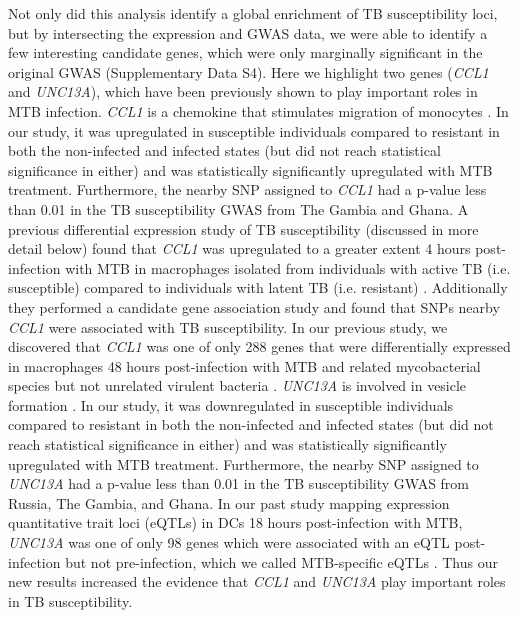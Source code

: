 \documentclass[fleqn,10pt]{wlscirep}
\begin{document}
Not only did this analysis identify a global enrichment of TB
susceptibility loci, but by intersecting the expression and GWAS data,
we were able to identify a few interesting candidate genes, which were
only marginally significant in the original GWAS (Supplementary Data
S4). Here we highlight two genes (\emph{CCL1} and \emph{UNC13A}),
which have been previously shown to play important roles in MTB
infection. \emph{CCL1} is a chemokine that stimulates migration of
monocytes \cite{Miller1992}. In our study, it was upregulated in
susceptible individuals compared to resistant in both the non-infected
and infected states (but did not reach statistical significance in
either) and was statistically significantly upregulated with MTB
treatment. Furthermore, the nearby SNP assigned to \emph{CCL1} had a
p-value less than 0.01 in the TB susceptibility GWAS from The Gambia
and Ghana. A previous differential expression study of TB
susceptibility (discussed in more detail below) found that \emph{CCL1}
was upregulated to a greater extent 4 hours post-infection with MTB in
macrophages isolated from individuals with active TB (i.e.
susceptible) compared to individuals with latent TB (i.e. resistant)
\cite{Thuong2008}. Additionally they performed a candidate gene
association study and found that SNPs nearby \emph{CCL1} were
associated with TB susceptibility. In our previous study, we
discovered that \emph{CCL1} was one of only 288 genes that were
differentially expressed in macrophages 48 hours post-infection with
MTB and related mycobacterial species but not unrelated virulent
bacteria \cite{Blischak2015}. \emph{UNC13A} is involved in vesicle
formation \cite{Sudhof2004}. In our study, it was downregulated in
susceptible individuals compared to resistant in both the non-infected
and infected states (but did not reach statistical significance in
either) and was statistically significantly upregulated with MTB
treatment. Furthermore, the nearby SNP assigned to \emph{UNC13A} had a
p-value less than 0.01 in the TB susceptibility GWAS from Russia, The
Gambia, and Ghana. In our past study mapping expression quantitative
trait loci (eQTLs) in DCs 18 hours post-infection with MTB,
\emph{UNC13A} was one of only 98 genes which were associated with an
eQTL post-infection but not pre-infection, which we called
MTB-specific eQTLs \cite{Barreiro2012}. Thus our new results increased
the evidence that \emph{CCL1} and \emph{UNC13A} play important roles
in TB susceptibility.
\end{document}
